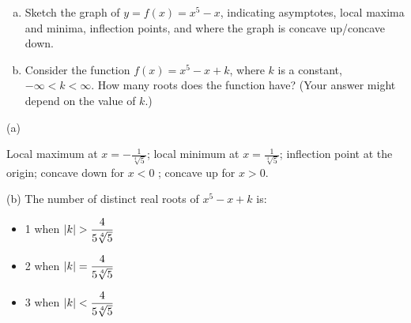 \begin{question}[2011H]
\begin{enumerate}[(a)]
\item Sketch the graph of $y=f(x)=x^5-x$, indicating asymptotes,
local maxima and minima, inflection points, and where the
graph is concave up/concave down.

\item Consider the function $f(x)=x^5-x+k$, where $k$ is a constant,
$-\infty<k<\infty$. How many roots does the function have? (Your answer might
depend on the value of $k$.)
\end{enumerate}
\end{question}
%
\begin{answer}
(a)
\begin{center}\end{center}
Local  maximum at $x=-\frac{1}{\sqrt[4]{5}}$; 
local  minimum at $x=\frac{1}{\sqrt[4]{5}}$; 
inflection point at the origin; 
concave down for $x<0$ ; concave up for $x>0$.

(b) The number of distinct real roots of $x^5-x+k$ is:
\begin{itemize}
\item 1 when $|k|>\dfrac{4}{5\root{4}\of{5}}$
\item 2 when $|k|=\dfrac{4}{5\root{4}\of{5}}$
\item 3 when $|k|<\dfrac{4}{5\root{4}\of{5}}$
\end{itemize}
\end{answer}
